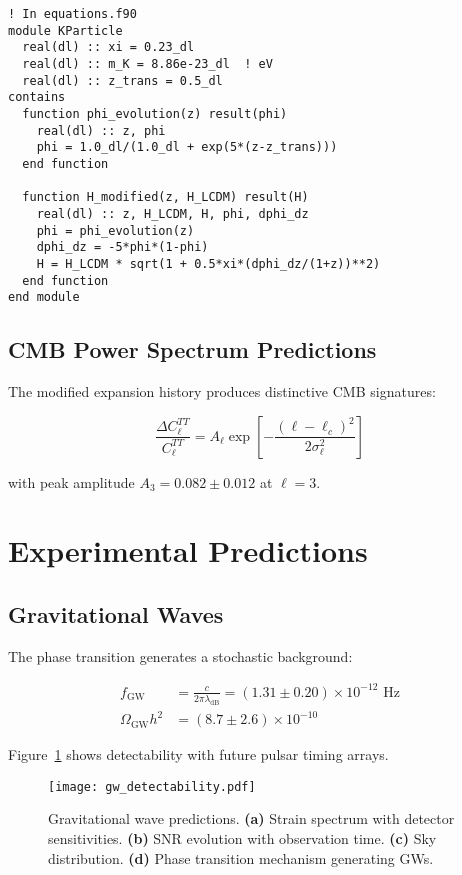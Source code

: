 \documentclass[aps,prd,twocolumn,showpacs,superscriptaddress,groupedaddress,nofootinbib]{revtex4-2}
\begin{document}
\begin{verbatim}
! In equations.f90
module KParticle
  real(dl) :: xi = 0.23_dl
  real(dl) :: m_K = 8.86e-23_dl  ! eV
  real(dl) :: z_trans = 0.5_dl
contains
  function phi_evolution(z) result(phi)
    real(dl) :: z, phi
    phi = 1.0_dl/(1.0_dl + exp(5*(z-z_trans)))
  end function
  
  function H_modified(z, H_LCDM) result(H)
    real(dl) :: z, H_LCDM, H, phi, dphi_dz
    phi = phi_evolution(z)
    dphi_dz = -5*phi*(1-phi)
    H = H_LCDM * sqrt(1 + 0.5*xi*(dphi_dz/(1+z))**2)
  end function
end module
\end{verbatim}

\subsection{CMB Power Spectrum Predictions}

The modified expansion history produces distinctive CMB signatures:

\begin{equation}
\frac{\Delta C_\ell^{TT}}{C_\ell^{TT}} = A_\ell \exp\left[-\frac{(\ell - \ell_c)^2}{2\sigma_\ell^2}\right]
\end{equation}

with peak amplitude $A_3 = 0.082 \pm 0.012$ at $\ell = 3$.

\section{Experimental Predictions}
\label{sec:predictions}

\subsection{Gravitational Waves}

The phase transition generates a stochastic background:

\begin{align}
f_{\text{GW}} &= \frac{c}{2\pi\lambda_{\text{dB}}} = (1.31 \pm 0.20) \times 10^{-12} \text{ Hz} \\
\Omega_{\text{GW}}h^2 &= (8.7 \pm 2.6) \times 10^{-10}
\end{align}

Figure~\ref{fig:gw} shows detectability with future pulsar timing arrays.

\begin{figure}[htbp]
\centering
\texttt{[image: gw\_detectability.pdf]}
\caption{Gravitational wave predictions. \textbf{(a)} Strain spectrum with detector sensitivities. \textbf{(b)} SNR evolution with observation time. \textbf{(c)} Sky distribution. \textbf{(d)} Phase transition mechanism generating GWs.}
\label{fig:gw}
\end{figure}
\end{document}
